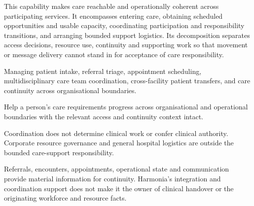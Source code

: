 This capability makes care reachable and operationally coherent across participating services. It encompasses entering care, obtaining scheduled opportunities and usable capacity, coordinating participation and responsibility transitions, and arranging bounded support logistics. Its decomposition separates access decisions, resource use, continuity and supporting work so that movement or message delivery cannot stand in for acceptance of care responsibility.



Managing patient intake, referral triage, appointment scheduling, multidisciplinary care team coordination, cross-facility patient transfers, and care continuity across organisational boundaries.



Help a person's care requirements progress across organisational and operational boundaries with the relevant access and continuity context intact.



Coordination does not determine clinical work or confer clinical authority. Corporate resource governance and general hospital logistics are outside the bounded care-support responsibility.



Referrals, encounters, appointments, operational state and communication provide material information for continuity. Harmonia's integration and coordination support does not make it the owner of clinical handover or the originating workforce and resource facts.


